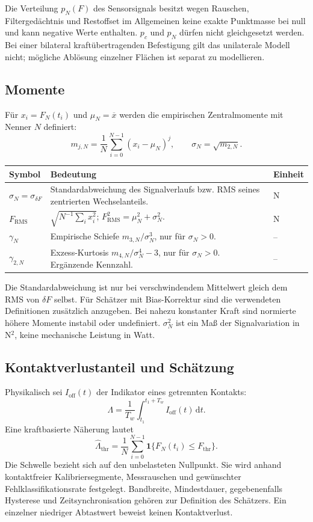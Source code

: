 \documentclass[11pt,a4paper]{article}
\makeatletter
\newcommand{\dd}{\mathrm{d}}
\newenvironment{symtab}{\begin{longtable}{@{}L{.22\textwidth}L{.62\textwidth}L{.12\textwidth}@{}}\toprule\textbf{Symbol}&\textbf{Bedeutung}&\textbf{Einheit}\\\midrule\endhead}{\bottomrule\end{longtable}}
\makeatother
\begin{document}
Die Verteilung $p_N(F)$ des Sensorsignals besitzt wegen Rauschen, Filtergedächtnis und Restoffset im Allgemeinen keine exakte Punktmasse bei null und kann negative Werte enthalten. $p_c$ und $p_N$ dürfen nicht gleichgesetzt werden. Bei einer bilateral kraftübertragenden Befestigung gilt das unilaterale Modell nicht; mögliche Ablösung einzelner Flächen ist separat zu modellieren.

\subsection{Momente}
Für $x_i=F_N(t_i)$ und $\mu_N=\overline{x}$ werden die empirischen Zentralmomente mit Nenner $N$ definiert:
\begin{equation}
m_{j,N}=\frac1N\sum_{i=0}^{N-1}(x_i-\mu_N)^j,\qquad \sigma_N=\sqrt{m_{2,N}}.
\end{equation}
\begin{symtab}
$\sigma_N=\sigma_{\delta F}$&Standardabweichung des Signalverlaufs bzw. RMS seines zentrierten Wechselanteils.&N\\
$F_{\mathrm{RMS}}$&$\sqrt{N^{-1}\sum_i x_i^2}$; $F_{\mathrm{RMS}}^2=\mu_N^2+\sigma_N^2$.&N\\
$\gamma_N$&Empirische Schiefe $m_{3,N}/\sigma_N^3$, nur für $\sigma_N>0$.&--\\
$\gamma_{2,N}$&Exzess-Kurtosis $m_{4,N}/\sigma_N^4-3$, nur für $\sigma_N>0$. Ergänzende Kennzahl.&--\\
\end{symtab}
Die Standardabweichung ist nur bei verschwindendem Mittelwert gleich dem RMS von $\delta F$ selbst. Für Schätzer mit Bias-Korrektur sind die verwendeten Definitionen zusätzlich anzugeben. Bei nahezu konstanter Kraft sind normierte höhere Momente instabil oder undefiniert. $\sigma_N^2$ ist ein Maß der Signalvariation in N$^2$, keine mechanische Leistung in Watt.

\subsection{Kontaktverlustanteil und Schätzung}
Physikalisch sei $I_{\mathrm{off}}(t)$ der Indikator eines getrennten Kontakts:
\begin{equation}
\Lambda=\frac1{T_w}\int_{t_1}^{t_1+T_w} I_{\mathrm{off}}(t)\,\dd t.
\end{equation}
Eine kraftbasierte Näherung lautet
\begin{equation}
\hat\Lambda_{\mathrm{thr}}=\frac1N\sum_{i=0}^{N-1}\mathbf1\{F_N(t_i)\le F_{\mathrm{thr}}\}.
\label{eq:liftoff}
\end{equation}
Die Schwelle bezieht sich auf den unbelasteten Nullpunkt. Sie wird anhand kontaktfreier Kalibriersegmente, Messrauschen und gewünschter Fehlklassifikationsrate festgelegt. Bandbreite, Mindestdauer, gegebenenfalls Hysterese und Zeitsynchronisation gehören zur Definition des Schätzers. Ein einzelner niedriger Abtastwert beweist keinen Kontaktverlust.
\end{document}
